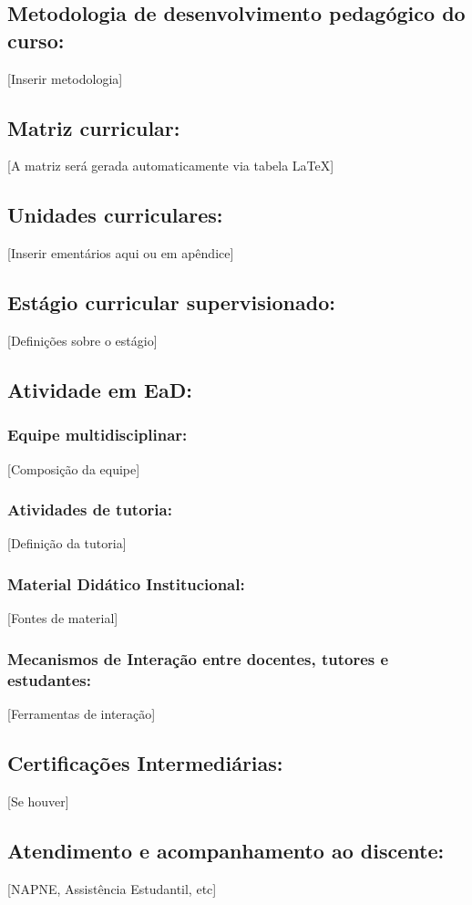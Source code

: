 \documentclass{ifsc-ppc}
\begin{document}
\subsection{Metodologia de desenvolvimento pedagógico do curso:}
[Inserir metodologia]

\subsection{Matriz curricular:}
[A matriz será gerada automaticamente via tabela LaTeX]

\subsection{Unidades curriculares:}
[Inserir ementários aqui ou em apêndice]

\subsection{Estágio curricular supervisionado:}
[Definições sobre o estágio]

\subsection{Atividade em EaD:}
\subsubsection{Equipe multidisciplinar:}
[Composição da equipe]
\subsubsection{Atividades de tutoria:}
[Definição da tutoria]
\subsubsection{Material Didático Institucional:}
[Fontes de material]
\subsubsection{Mecanismos de Interação entre docentes, tutores e estudantes:}
[Ferramentas de interação]

\subsection{Certificações Intermediárias:}
[Se houver]

\subsection{Atendimento e acompanhamento ao discente:}
[NAPNE, Assistência Estudantil, etc]
\end{document}
